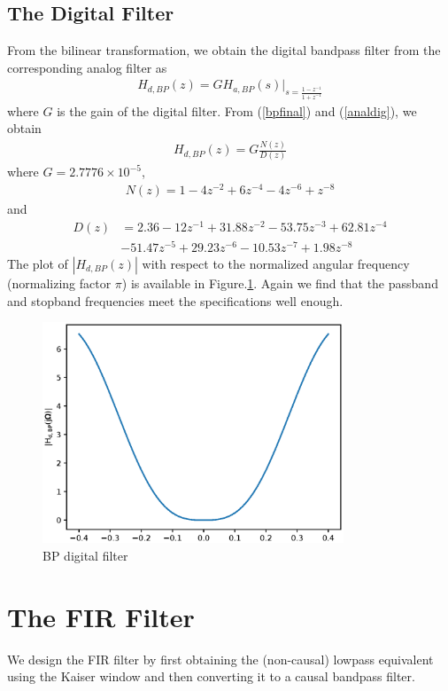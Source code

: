 \documentclass[journal,12pt,twocolumn]{IEEEtran}
\begin{document}
\subsection{The Digital Filter}
From the bilinear transformation, we obtain the digital bandpass filter from the corresponding analog filter as
\begin{eqnarray}
\label{analdig}
H_{d,BP}(z) = GH_{a,BP}(s)\vert_{s = \frac{1-z^{-1}}{1 + z^{-1}}}
\end{eqnarray}
where $G$ is the gain of the digital filter.  From (\ref{bpfinal}) and (\ref{analdig}), we obtain
\begin{eqnarray}
H_{d,BP}(z) = G \frac{N(z)}{D(z)}
\end{eqnarray}
where $G = 2.7776 \times 10^{-5}$,
\begin{eqnarray}
N(z) =  1 - 4 z^{-2} + 6 z^{-4} - 4z^{-6} + z^{-8} 
\end{eqnarray}
and
\begin{align}
D(z) &= 2.36 -12z^{-1} + 31.88z^{-2}  -53.75z^{-3} +  62.81z^{-4}\nonumber \\
  &-51.47z^{-5}+   29.23z^{-6}  -10.53z^{-7} +1.98z^{-8}
\end{align}
The plot of $|H_{d,BP}(z)|$ with respect to the normalized angular frequency (normalizing factor $\pi$) is available in Figure.\ref{fig:BP_digital}.  Again we
find that the passband and stopband frequencies meet the specifications well enough.
\begin{figure}
    \centering
    \includegraphics[width = 9cm]{./figure/iir/iir_BPdigital.eps}
    \caption{BP digital filter}
    \label{fig:BP_digital}
\end{figure}
\section{The FIR Filter}
We design the FIR filter by first obtaining the (non-causal) lowpass equivalent using the Kaiser window
and then
converting it to a causal bandpass filter.
\end{document}
